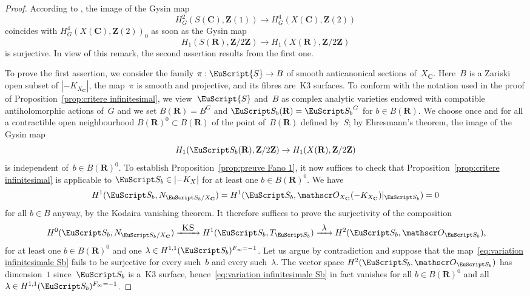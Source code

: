 \documentclass[JEP,XML,SOM,Unicode]{cedram}
\let\mathcal\EuScript
\newcommand{\To}[1]{\mathchoice{\xrightarrow{\textstyle\kern4pt#1\kern3pt}}{\stackrel{#1}{\longrightarrow}}{}{}}
\theoremstyle{plain}
\theoremstyle{definition}
\numberwithin{equation}{section}
\newcommand{\sO}{{\mathscr O}}
\renewcommand{\C}{{\mathbf C}}
\newcommand{\R}{{\mathbf R}}
\newcommand{\Z}{{\mathbf Z}}
\newcommand{\KS}{\textsc{KS}}
\begin{document}
\begin{proof}
According to \cite[Prop.\,\ref*{BW1-prop:weak lefschetz surjectivity}, Rem.\,\ref*{BW1-rk:topological condition 1-cycles and ak}\,(i)]{BW1},
the image of the Gysin map
\[
H^2_G(S(\C),\Z(1)) \to H^4_G(X(\C),\Z(2))
\]
coincides with $H^4_G(X(\C),\Z(2))_0$
as soon as
the Gysin map
\[
H_1(S(\R),\Z/2\Z)\to H_1(X(\R),\Z/2\Z)
\]
is surjective.
In view of this remark, the second assertion results from the first one.

To prove the first assertion,
we consider
the family $\pi:\mathcal{S}\to B$
of smooth anticanonical sections of~$X_{\C}$.
Here~$B$ is a Zariski open subset of $|{-}K_{X_\C}|$,
the map~$\pi$ is smooth and projective, and its fibres are~K3 surfaces.
To conform with
the notation used in the proof of Proposition~\ref{prop:critere infinitesimal},
we view~$\mathcal{S}$ and~$B$ as complex analytic varieties endowed with compatible antiholomorphic actions of~$G$
and we set $B(\R)=B^G$
and $\mathcal S_b(\R)={\mathcal S_b}^G$
for $b \in B(\R)$.
We choose once and for all
a contractible open neighbourhood
$B(\R)^0\subset B(\R)$
of the point of~$B(\R)$ defined by~$S$; by Ehresmann's theorem,
the image of the Gysin map
\[
H_1(\mathcal S_b(\R),\Z/2\Z)\to H_1(X(\R),\Z/2\Z)
\]
is independent of~$b\in B(\R)^0$.
To establish Proposition~\ref{prop:preuve Fano 1}, it now suffices
to check that
Proposition~\ref{prop:critere infinitesimal} is applicable
to $\mathcal S_b \in |{-}K_X|$ for at least one $b \in B(\R)^0$.
We have
\[
H^1(\mathcal S_b,N_{\mathcal S_b/X_\C})=H^1(\mathcal S_b,\sO_{X_\C}(-K_{X_\C})|_{\mathcal S_b})=0
\]
for all $b \in B$ anyway,
by the Kodaira vanishing theorem.
It therefore suffices to prove the surjectivity of the composition
\begin{equation}
\label{eq:variation infinitesimale Sb}
H^0(\mathcal S_b,N_{\mathcal S_b/X_\C})\To{\KS}
H^1(\mathcal S_b,T_{\mathcal S_b})\To{\lambda}
H^2(\mathcal S_b,\sO_{\mathcal S_b})\rlap{\text{,}}
\end{equation}
for at least one $b \in B(\R)^0$
and one $\lambda\in H^{1,1}(\mathcal S_b)^{F_\infty=-1}$.
Let us argue by contradiction and suppose that
the map~\eqref{eq:variation infinitesimale Sb}
fails to be surjective
for every such~$b$ and every such~$\lambda$.
The vector space $H^2(\mathcal S_b,\sO_{\mathcal S_b})$
has dimension~$1$
since~$\mathcal S_b$ is a~K3 surface,
hence~\eqref{eq:variation infinitesimale Sb} in fact vanishes for all $b \in B(\R)^0$
and all~$\lambda\in H^{1,1}(\mathcal S_b)^{F_\infty=-1}$.


\end{proof}
\end{document}
